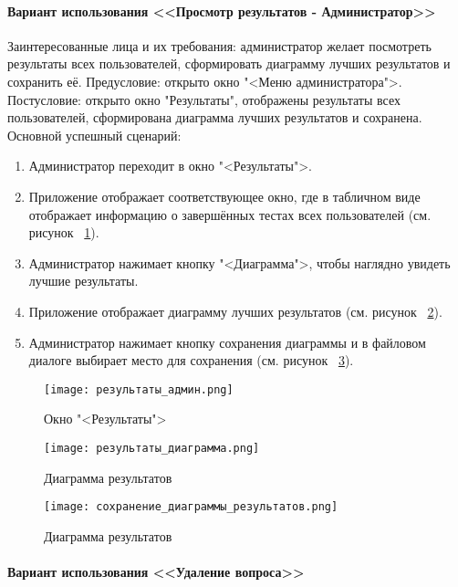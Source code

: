\paragraph{Вариант использования <<Просмотр результатов - Администратор>>}

Заинтересованные лица и их требования: администратор желает посмотреть результаты всех пользователей, сформировать диаграмму лучших результатов и сохранить её.
\newline Предусловие: открыто окно "<Меню администратора">.
\newline Постусловие: открыто окно "Результаты", отображены результаты всех пользователей, сформирована диаграмма лучших результатов и сохранена.
\newline Основной успешный сценарий:
\begin{enumerate}
	\item Администратор переходит в окно "<Результаты">.
	\item Приложение отображает соответствующее окно, где в табличном виде отображает информацию о завершённых тестах всех пользователей (см. рисунок ~\ref{admin_results:image}).
	\item Администратор нажимает кнопку "<Диаграмма">, чтобы наглядно увидеть лучшие результаты.
	\item Приложение отображает диаграмму лучших результатов (см. рисунок ~\ref{results_chart:image}).
	\item Администратор нажимает кнопку сохранения диаграммы и в файловом диалоге выбирает место для сохранения (см. рисунок ~\ref{saving_chart:image}).
\end{enumerate}

\begin{figure}[H]
	\centering
	\texttt{[image: результаты\_админ.png]}
	\caption{Окно "<Результаты">}
	\label{admin_results:image}
\end{figure}
\begin{figure}[H]
	\centering
	\texttt{[image: результаты\_диаграмма.png]}
	\caption{Диаграмма результатов}
	\label{results_chart:image}
\end{figure}
\begin{figure}[H]
	\centering
	\texttt{[image: сохранение\_диаграммы\_результатов.png]}
	\caption{Диаграмма результатов}
	\label{saving_chart:image}
\end{figure}

\paragraph{Вариант использования <<Удаление вопроса>>}

